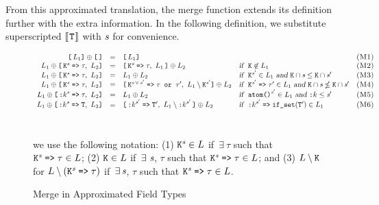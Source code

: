 From this approximated translation, the merge function extends its definition further with the extra information.
In the following definition, we substitute superscripted $[\![\hspace{.07em}\texttt{T}\hspace{.07em}]\!]$ with $\textit{s}$ for convenience.

\begin{figure} [H]
   \[\begin{array}{rclll}
      \texttt{[}\,L_1\texttt{]} \oplus \texttt{[\,]} &=& \texttt{[}\,L_1\texttt{]} && \textsc{(M1)} \\
      L_1 \oplus \texttt{[}\,\ETK^{\orgtype}\fto\tau,\,\,L_2\texttt{]} &=& \texttt{[}\,\ETK^{\orgtype}\fto\tau,\,\,L_1\,\texttt{]} \oplus L_2 & \textsl{if }\ \ETK\not\in L_1 & \textsc{(M2)} \\
      L_1 \oplus \texttt{[}\,\ETK^{\orgtype}\fto\tau,\,\,L_2\texttt{]} &=& L_1 \oplus L_2 & \textsl{if }\ \ETK^{\prm{\orgtype}} \in L_1 \textsl{ and } \ETK \cap {\orgtype} \leq \ETK \cap \prm{\orgtype} & \textsc{(M3)} \\
      L_1 \oplus \texttt{[}\,\ETK^{\orgtype}\fto\tau,\,\,L_2\texttt{]} &=& \texttt{[}\,\ETK^{\orgtype\,\vee\,\prm{\orgtype}}\fto\tau \texttt{ or }\prm{\tau},\,\,L_1 \setminus \ETK^{\prm{\orgtype}}\texttt{]} \oplus L_2  & \textsl{if }\ \ETK^{\prm{\orgtype}}\fto\prm{\tau} \in L_1 \textsl{ and } \ETK \cap \orgtype \nleq \ETK \cap \prm{\orgtype} & \textsc{(M4)} \\
      L_1 \oplus \texttt{[}\,\SAtom^{\orgtype}\fto\tau,\,\,L_2\texttt{]} &=& L_1 \oplus L_2 & \textsl{if }\ \texttt{atom()}^{\prm{\orgtype}} \in L_1 \textsl{ and } \SAtom \leq \prm{\orgtype} & \textsc{(M5)} \\
      L_1 \oplus \texttt{[}\,\SAtom^{\orgtype}\fto\ETT,\,\,L_2\texttt{]} &=& \texttt{[}\,\SAtom^{\prm{\orgtype}}\fto\prm{\ETT},\,\,L_1 \setminus \SAtom^{\prm{\orgtype}}\,\texttt{]} \oplus L_2 & \textsl{if }\ \SAtom^{\prm{\orgtype}}\fto\texttt{if\_set}(\prm{\ETT}) \in L_1 & \textsc{(M6)} \\
      \\
   \end{array}\]
   \\[4mm] we use the following notation: (1) $\texttt{K}^{\textit{s}} \in L$ if $\,\exists\ \tau$ such that $\texttt{K}^{\textit{s}}\;\texttt{=>}\;\tau \in L$; (2) $\texttt{K} \in L$ if $\,\exists\ \textit{s}$, $\tau$ such that $\texttt{K}^{\textit{s}}\;\texttt{=>}\;\tau \in L$; and (3) $L \setminus \texttt{K}$ for $L \setminus (\texttt{K}^{\textit{s}}\;\texttt{=>}\;\tau)$ if $\,\exists\, \textit{s}$, $\tau$ such that $\texttt{K}^{\textit{s}}\;\texttt{=>}\;\tau \in L$.
   \caption{Merge in Approximated Field Types}
   \label{app:merge-in-approximated-field-types}
\end{figure}

